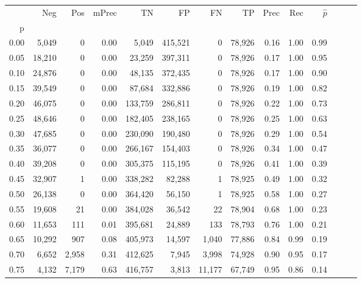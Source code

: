 \begin{tabular}{rrrrrrrrrrrrrr}
\toprule
{} &     Neg &     Pos & mPrec &       TN &       FP &      FN &      TP &  Prec &   Rec & $\hat{p}$ \\
p    &         &         &       &          &          &         &         &       &       &           \\
\midrule
0.00 &   5,049 &       0 &  0.00 &    5,049 &  415,521 &       0 &  78,926 &  0.16 &  1.00 &      0.99 \\
0.05 &  18,210 &       0 &  0.00 &   23,259 &  397,311 &       0 &  78,926 &  0.17 &  1.00 &      0.95 \\
0.10 &  24,876 &       0 &  0.00 &   48,135 &  372,435 &       0 &  78,926 &  0.17 &  1.00 &      0.90 \\
0.15 &  39,549 &       0 &  0.00 &   87,684 &  332,886 &       0 &  78,926 &  0.19 &  1.00 &      0.82 \\
0.20 &  46,075 &       0 &  0.00 &  133,759 &  286,811 &       0 &  78,926 &  0.22 &  1.00 &      0.73 \\
0.25 &  48,646 &       0 &  0.00 &  182,405 &  238,165 &       0 &  78,926 &  0.25 &  1.00 &      0.63 \\
0.30 &  47,685 &       0 &  0.00 &  230,090 &  190,480 &       0 &  78,926 &  0.29 &  1.00 &      0.54 \\
0.35 &  36,077 &       0 &  0.00 &  266,167 &  154,403 &       0 &  78,926 &  0.34 &  1.00 &      0.47 \\
0.40 &  39,208 &       0 &  0.00 &  305,375 &  115,195 &       0 &  78,926 &  0.41 &  1.00 &      0.39 \\
0.45 &  32,907 &       1 &  0.00 &  338,282 &   82,288 &       1 &  78,925 &  0.49 &  1.00 &      0.32 \\
0.50 &  26,138 &       0 &  0.00 &  364,420 &   56,150 &       1 &  78,925 &  0.58 &  1.00 &      0.27 \\
0.55 &  19,608 &      21 &  0.00 &  384,028 &   36,542 &      22 &  78,904 &  0.68 &  1.00 &      0.23 \\
0.60 &  11,653 &     111 &  0.01 &  395,681 &   24,889 &     133 &  78,793 &  0.76 &  1.00 &      0.21 \\
0.65 &  10,292 &     907 &  0.08 &  405,973 &   14,597 &   1,040 &  77,886 &  0.84 &  0.99 &      0.19 \\
0.70 &   6,652 &   2,958 &  0.31 &  412,625 &    7,945 &   3,998 &  74,928 &  0.90 &  0.95 &      0.17 \\
0.75 &   4,132 &   7,179 &  0.63 &  416,757 &    3,813 &  11,177 &  67,749 &  0.95 &  0.86 &      0.14 \\

\end{tabular}

